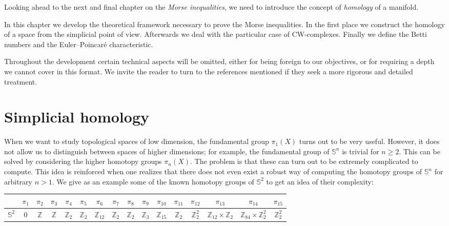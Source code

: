
Looking ahead to the next and final chapter on the \textit{Morse inequalities}, we need to introduce the concept of \textit{homology} of a manifold.

In this chapter we develop the theoretical framework necessary to prove the Morse inequalities. In the first place we construct the homology of a space from the simplicial point of view. Afterwards we deal with the particular case of CW-complexes. Finally we define the Betti numbers and the Euler--Poincaré characteristic.

Throughout the development certain technical aspects will be omitted, either for being foreign to our objectives, or for requiring a depth we cannot cover in this format. We invite the reader to turn to the references mentioned if they seek a more rigorous and detailed treatment.

\section{Simplicial homology}

When we want to study topological spaces of low dimension, the fundamental group $\pi_1(X)$ turns out to be very useful. However, it does not allow us to distinguish between spaces of higher dimensions; for example, the fundamental group of $\mathbb{S}^n$ is trivial for $n\ge 2$. This can be solved by considering the higher homotopy groups $\pi_n(X)$. The problem is that these can turn out to be extremely complicated to compute. This idea is reinforced when one realizes that there does not even exist a robust way of computing the homotopy groups of $\mathbb{S}^n$ for arbitrary $n>1$. We give as an example some of the known homotopy groups of $\mathbb{S}^2$ to get an idea of their complexity:
\begin{center}
    \begin{tabular}{c|ccccccccccccccc}
    & $\pi_1$ & $\pi_2$ & $\pi_3$ & $\pi_4$ & $\pi_5$ & $\pi_6$ & $\pi_7$ & $\pi_8$ & $\pi_9$ & $\pi_{10}$ & $\pi_{11}$ & $\pi_{12}$ & $\pi_{13}$ & $\pi_{14}$ & $\pi_{15}$ \\
    \hline
    $\mathbb{S}^2$ & $0$ & $\mathbb{Z}$ & $\mathbb{Z}$ & $\mathbb{Z}_2$ & $\mathbb{Z}_2$ & $\mathbb{Z}_{12}$ & $\mathbb{Z}_2$ & $\mathbb{Z}_2$ & $\mathbb{Z}_3$ & $\mathbb{Z}_{15}$ & $\mathbb{Z}_2$ & $\mathbb{Z}_2^2$ & $\mathbb{Z}_{12}\times \mathbb{Z}_2$ & $\mathbb{Z}_{84}\times \mathbb{Z}_2^2$ & $\mathbb{Z}_2^2$
    \end{tabular}
\end{center}
\vspace{1em}

